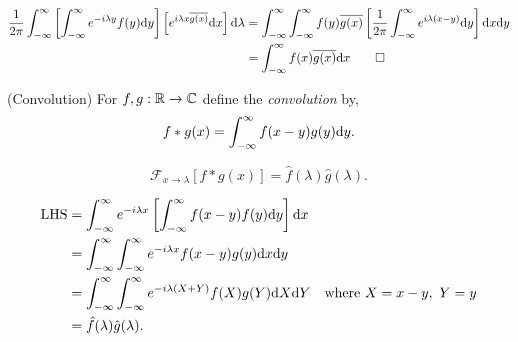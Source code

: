 \documentclass{article}
\begin{document}
\pf 
\begin{align*}
	\frac {1}{2\pi}\int_{-\infty}^\infty\left[\int_{-\infty}^\infty e^{-i\lambda y}f(y)\mathrm dy\right]\left[e^{i\lambda x\overline{g(x)}}\mathrm dx\right]\mathrm d\lambda&=\int_{-\infty}^\infty\int_{-\infty}^\infty f(y)\overline{g(x)}\left[\frac1{2\pi}\int_{-\infty}^\infty e^{i\lambda(x-y)}\mathrm dy\right]\mathrm dx\mathrm dy\\
	&=\int_{-\infty}^\infty f(x)\overline{g(x)}\mathrm dx\qed
\end{align*}
\begin{definition}
	(Convolution) For $ f,g:\mathbb{R}\to\mathbb{C} $ define the \textit{convolution} by,
	\[
	  f*g(x)=\int_{-\infty}^\infty f(x-y)g(y)\mathrm dy.
	\]
\end{definition}
\begin{proposition}
  \[
	  \mathcal F_{x\to \lambda}[f*g(x)]=\hat f(\lambda)\hat g(\lambda).
  \]
\end{proposition}
\pf 
\begin{align*}
	\text{LHS} &=\int_{-\infty}^\infty e^{-i\lambda x}\left[\int_{-\infty}^\infty f(x-y)f(y)\mathrm dy\right]\mathrm dx\\
	   &=\int_{-\infty}^\infty\int_{-\infty}^\infty e^{-i\lambda x}f(x-y)g(y)\mathrm dx\mathrm dy\\
	   &=\int_{-\infty}^\infty\int_{-\infty}^\infty e^{-i\lambda(X+Y)}f(X)g(Y)\mathrm dX\mathrm dY\quad\text{where}\  X=x-y,\ Y=y\\
	   &= \hat f(\lambda)\hat g(\lambda).
\end{align*}
\end{document}
